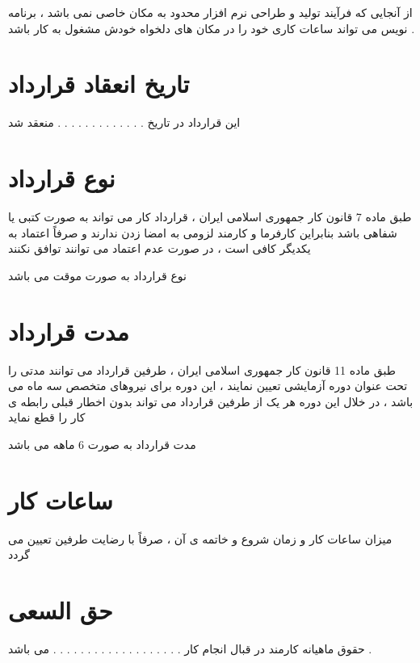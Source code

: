 \documentclass[12pt]{article}
\begin{document}
از آنجایی که فرآیند تولید و طراحی نرم افزار محدود به مکان خاصی نمی باشد ، برنامه نویس می تواند ساعات کاری خود را در مکان های دلخواه خودش مشغول به کار باشد .


\section{تاریخ انعقاد قرارداد}

این قرارداد در تاریخ . . . . . . . . . . . . . منعقد شد

\section{نوع قرارداد}

\begin{tcolorbox}[
title=تبصره 2
]
طبق ماده 7 قانون کار جمهوری اسلامی ایران ، قرارداد کار می تواند به صورت کتبی یا شفاهی باشد بنابراین کارفرما و  کارمند لزومی به امضا زدن ندارند و صرفاً اعتماد به یکدیگر کافی است ، در صورت عدم اعتماد می توانند توافق نکنند
\end{tcolorbox}

نوع قرارداد به صورت موقت می باشد


\section{مدت قرارداد}

\begin{tcolorbox}[
title=تبصره 3
]
طبق ماده 11 قانون کار جمهوری اسلامی ایران ، طرفین قرارداد می توانند مدتی را تحت عنوان دوره آزمایشی تعیین نمایند ، این دوره برای نیروهای متخصص سه ماه می باشد ، در خلال این دوره هر یک از طرفین قرارداد می تواند بدون اخطار قبلی رابطه ی کار را قطع نماید 
\end{tcolorbox}

مدت قرارداد به صورت 6 ماهه می باشد


\section{ساعات کار}

میزان ساعات کار و زمان شروع و خاتمه ی آن ، صرفاً با رضایت طرفین تعیین می گردد


\section{حق السعی}

حقوق ماهیانه کارمند در قبال انجام کار . . . . . . . . . . . . . . . . . . . می باشد .
\end{document}
